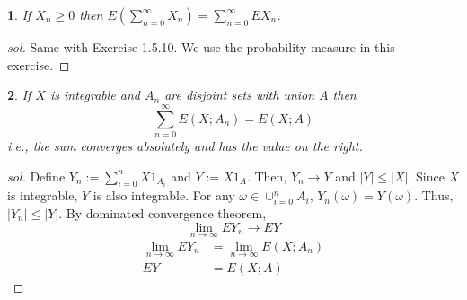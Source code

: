\documentclass{report}
\newtheorem{ex}{}[section]
\begin{document}
\begin{ex}
If $X_n \ge 0$ then $E(\sum_{n=0}^\infty X_n) = \sum_{n=0}^\infty EX_n$.
\end{ex}
\begin{proof}[sol]
Same with Exercise 1.5.10.  We use the probability measure in this exercise.
\end{proof}
\begin{ex}
If $X$ is integrable and $A_n$ are disjoint sets with union $A$ then
\[\sum_{n=0}^\infty E(X; A_n) = E(X; A)\]
i.e., the sum converges absolutely and has the value on the right.
\end{ex}
\begin{proof}[sol]
Define $Y_n := \sum_{i=0}^n X1_{A_i}$ and $Y:= X1_A$. Then, $Y_n \to Y$ and $|Y| \le |X|$. Since $X$ is integrable, $Y$ is also integrable. For any $\omega \in \cup_{i=0}^n A_i$, $Y_n(\omega) = Y(\omega)$. Thus, $|Y_n| \le |Y|$. By dominated convergence theorem,
\[\lim_{n\to\infty} EY_n  \to EY \]
\begin{align*}
    \lim_{n\to\infty} EY_n &= \lim_{n\to\infty} E(X;A_n)\\
    EY &= E(X;A)
\end{align*}
\end{proof}
\end{document}
